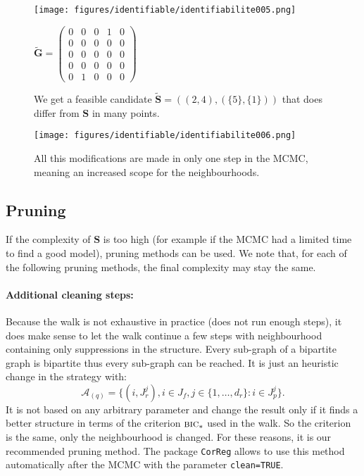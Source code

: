 \documentclass[12pt,a4paper]{report}
\begin{document}
\begin{figure}
	\begin{minipage}[c]{.45\linewidth}
\texttt{[image: figures/identifiable/identifiabilite005.png]} 
	\end{minipage}
	\begin{minipage}[c]{.45\linewidth}
		$\tilde{\boldsymbol{G}}=\left( \begin{array}{ccccc}
		0 & 0 & 0 & 1 & 0 \\ 
		0 &0 & 0 & 0 & 0 \\ 
		0 & 0 & 0 & 0 & 0 \\ 
		0 & 0 & 0 & 0 & 0 \\ 
		0 & 1& 0 & 0 & 0
		\end{array} \right)$
	\end{minipage}
	\caption{We get a feasible candidate $\tilde{\boldsymbol{S}}=((2,4),(\{5\},\{1\}))$ that does differ from $\boldsymbol{S}$ in many points. }\label{ident5}
\end{figure}

\begin{figure}
\centering
\texttt{[image: figures/identifiable/identifiabilite006.png]} 
	\caption{All this modifications are made in only one step in the MCMC, meaning an increased scope for the neighbourhoods.}\label{ident6}
\end{figure}

\FloatBarrier

	
	\subsection{Pruning}
		If the complexity of $\boldsymbol{S}$ is too high (for example if the MCMC had a limited time to find a good model), pruning methods can be used. We note that, for each of the following pruning methods, the final complexity may stay the same.
\paragraph{Additional cleaning steps:}
			Because the walk is not exhaustive in practice (does not run enough steps), it does make sense to let the walk continue a few steps with neighbourhood containing only suppressions in the structure. Every sub-graph of a bipartite graph is bipartite thus every sub-graph can be reached. It is just an heuristic change in the strategy with:
			\begin{equation}
				\mathcal{A}_{(q)}=\{(i,J_r^j), i \in J_f, j \in \{1,\dots,d_r \}: i \in J_p^j \}. \nonumber 
			\end{equation}
			It is not based on any arbitrary parameter and change the result only if it finds a better structure in terms of the criterion $\mbox{{\sc bic}}_*$ used in the walk. So the criterion is the same, only the neighbourhood is changed.
			For these reasons, it is our recommended pruning method. The package {\tt CorReg} allows to use this method automatically after the MCMC with the parameter {\tt clean=TRUE}.\\
			
\end{document}
